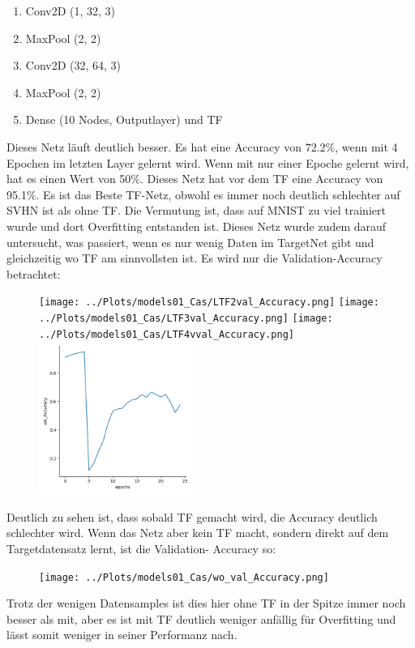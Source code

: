     \begin{enumerate}
        \item Conv2D (1, 32, 3)
        \item MaxPool (2, 2)
        \item Conv2D (32, 64, 3)
        \item MaxPool (2, 2)
        \item Dense (10 Nodes, Outputlayer) und TF
    \end{enumerate}
    Dieses Netz läuft deutlich besser. Es hat eine Accuracy von 72.2\%, wenn mit 4 Epochen im 
    letzten Layer gelernt wird. Wenn mit nur einer Epoche gelernt wird, hat es einen Wert von 
    50\%. 
    Dieses Netz hat vor dem TF eine Accuracy von 95.1\%. Es ist das Beste TF-Netz, obwohl es 
    immer noch deutlich schlechter auf SVHN ist als ohne TF. Die Vermutung ist, dass auf MNIST 
    zu viel trainiert wurde und dort Overfitting entstanden ist. Dieses Netz wurde zudem darauf 
    untersucht, was passiert, wenn es nur wenig Daten im TargetNet gibt und gleichzeitig wo TF am 
    sinnvollsten ist. Es wird nur die Validation-Accuracy betrachtet: 
    \begin{figure}[htpb]
        \texttt{[image: ../Plots/models01\_Cas/LTF2val\_Accuracy.png]}
        \texttt{[image: ../Plots/models01\_Cas/LTF3val\_Accuracy.png]}
        \texttt{[image: ../Plots/models01\_Cas/LTF4vval\_Accuracy.png]}
        \includegraphics[height=5cm]{../Plots/models01_Cas/Lval_Accuracy.png}
    \end{figure}

    Deutlich zu sehen ist, dass sobald TF gemacht wird, die Accuracy deutlich schlechter wird. 
    Wenn das Netz aber kein TF macht, sondern direkt auf dem Targetdatensatz lernt, ist die Validation-
    Accuracy so: 
    \begin{figure}[htpb]
        \texttt{[image: ../Plots/models01\_Cas/wo\_val\_Accuracy.png]}
    \end{figure}
    Trotz der wenigen Datensamples ist dies hier ohne TF in der Spitze immer noch besser als mit, 
    aber es ist mit TF deutlich weniger anfällig für Overfitting und lässt somit weniger in seiner 
    Performanz nach.

